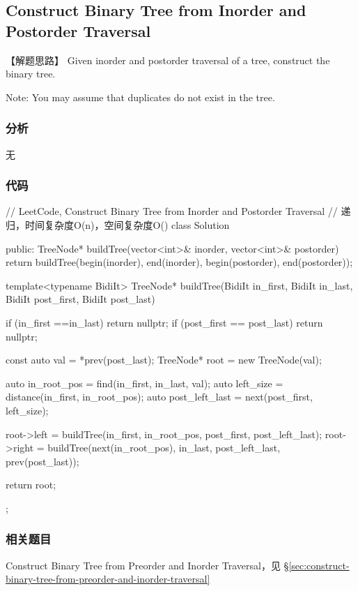 \subsection{Construct Binary Tree from Inorder and Postorder Traversal}
\label{sec:construct-binary-tree-from-inorder-and-postorder-traversal}


【解题思路】
Given inorder and postorder traversal of a tree, construct the binary tree.

Note:
You may assume that duplicates do not exist in the tree.


\subsubsection{分析}
无


\subsubsection{代码}
\begin{Code}
	// LeetCode, Construct Binary Tree from Inorder and Postorder Traversal
	// 递归，时间复杂度O(n)，空间复杂度O(\logn)
	class Solution {
		public:
		TreeNode* buildTree(vector<int>& inorder, vector<int>& postorder) {
			return buildTree(begin(inorder), end(inorder),
			begin(postorder), end(postorder));
		}
		
		template<typename BidiIt>
		TreeNode* buildTree(BidiIt in_first, BidiIt in_last,
		BidiIt post_first, BidiIt post_last) {
			if (in_first ==in_last) return nullptr;
			if (post_first == post_last) return nullptr;
			
			const auto val = *prev(post_last);
			TreeNode* root = new TreeNode(val);
			
			auto in_root_pos = find(in_first, in_last, val);
			auto left_size = distance(in_first, in_root_pos);
			auto post_left_last = next(post_first, left_size);
			
			root->left = buildTree(in_first, in_root_pos, post_first, post_left_last);
			root->right = buildTree(next(in_root_pos), in_last, post_left_last,
			prev(post_last));
			
			return root;
		}
	};
\end{Code}


\subsubsection{相关题目}
\begindot
\item Construct Binary Tree from Preorder and Inorder Traversal，见 \S \ref{sec:construct-binary-tree-from-preorder-and-inorder-traversal}
\myenddot


